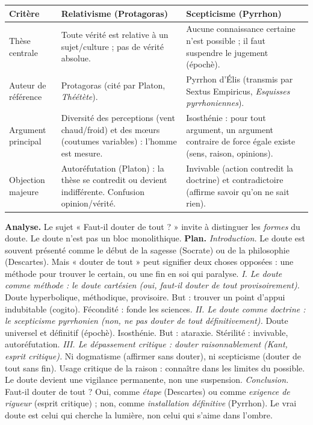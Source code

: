 \documentclass[11pt]{article}
\begin{document}
\begin{corrige}[Exercice 2]
\begin{center}
\begin{tabularx}{\linewidth}{|l|X|X|}
\hline
\rowcolor{popblueL} \textbf{Critère} & \textbf{Relativisme (Protagoras)} & \textbf{Scepticisme (Pyrrhon)} \\
\hline
Thèse centrale & Toute vérité est relative à un sujet/culture ; pas de vérité absolue. & Aucune connaissance certaine n'est possible ; il faut suspendre le jugement (épochè). \\
\hline
Auteur de référence & Protagoras (cité par Platon, \emph{Théétète}). & Pyrrhon d'Élis (transmis par Sextus Empiricus, \emph{Esquisses pyrrhoniennes}). \\
\hline
Argument principal & Diversité des perceptions (vent chaud/froid) et des mœurs (coutumes variables) : l'homme est mesure. & Isosthénie : pour tout argument, un argument contraire de force égale existe (sens, raison, opinions). \\
\hline
Objection majeure & Autoréfutation (Platon) : la thèse se contredit ou devient indifférente. Confusion opinion/vérité. & Invivable (action contredit la doctrine) et contradictoire (affirme savoir qu'on ne sait rien). \\
\hline
\end{tabularx}
\end{center}
\end{corrige}

\begin{corrige}[Exercice 3]
\textbf{Analyse.} Le sujet « Faut-il douter de tout ? » invite à distinguer les \emph{formes} du doute. Le doute n'est pas un bloc monolithique.
\textbf{Plan.}
\emph{Introduction.} Le doute est souvent présenté comme le début de la sagesse (Socrate) ou de la philosophie (Descartes). Mais « douter de tout » peut signifier deux choses opposées : une méthode pour trouver le certain, ou une fin en soi qui paralyse.
\emph{I. Le doute comme méthode : le doute cartésien (oui, faut-il douter de tout \emph{provisoirement}).} Doute hyperbolique, méthodique, provisoire. But : trouver un point d'appui indubitable (cogito). Fécondité : fonde les sciences.
\emph{II. Le doute comme doctrine : le scepticisme pyrrhonien (non, ne pas douter de tout \emph{définitivement}).} Doute universel et définitif (épochè). Isosthénie. But : ataraxie. Stérilité : invivable, autoréfutation.
\emph{III. Le dépassement critique : douter \emph{raisonnablement} (Kant, esprit critique).} Ni dogmatisme (affirmer sans douter), ni scepticisme (douter de tout sans fin). Usage critique de la raison : connaître dans les limites du possible. Le doute devient une vigilance permanente, non une suspension.
\emph{Conclusion.} Faut-il douter de tout ? Oui, comme \emph{étape} (Descartes) ou comme \emph{exigence de rigueur} (esprit critique) ; non, comme \emph{installation définitive} (Pyrrhon). Le vrai doute est celui qui cherche la lumière, non celui qui s'aime dans l'ombre.
\end{corrige}
\end{document}
